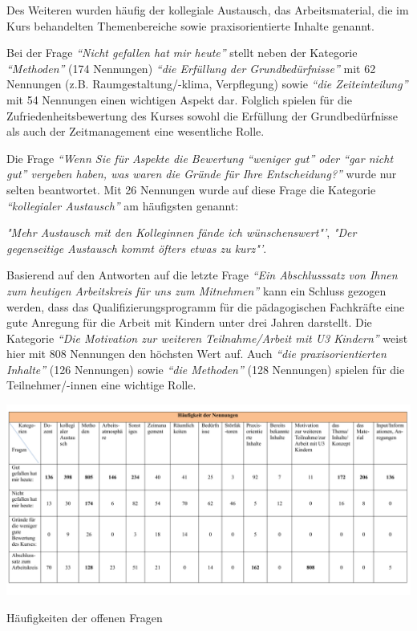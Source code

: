 \documentclass[12pt,a4paper]{article}
\begin{document}
Des Weiteren wurden häufig der kollegiale Austausch, das Arbeitsmaterial, die im Kurs behandelten Themenbereiche sowie praxisorientierte Inhalte genannt.

Bei der Frage \textit{"`Nicht gefallen hat mir heute"'} stellt neben der Kategorie \textit{"`Methoden"' }(174 Nennungen)\textit{ "`die Erfüllung der Grundbedürfnisse"'} mit 62 Nennungen (z.B. Raumgestaltung/-klima, Verpflegung) sowie \textit{"`die Zeiteinteilung"'} mit 54 Nennungen einen wichtigen Aspekt dar. Folglich spielen für die Zufriedenheitsbewertung des Kurses sowohl die Erfüllung der Grundbedürfnisse als auch der Zeitmanagement eine wesentliche Rolle. 

Die Frage \textit{"`Wenn Sie für Aspekte die Bewertung "`weniger gut"' oder "`gar nicht gut"' vergeben haben, was waren die Gründe für Ihre Entscheidung?"'} wurde nur selten beantwortet. Mit 26 Nennungen wurde auf diese Frage die Kategorie \textit{"`kollegialer Austausch"'} am häufigsten genannt:

\textit{ "Mehr Austausch mit den Kolleginnen fände ich wünschenswert"'},
\textit{ "Der gegenseitige Austausch kommt öfters etwas zu kurz"'}.

Basierend auf den Antworten auf die letzte Frage \textit{"`Ein Abschlusssatz von Ihnen zum heutigen Arbeitskreis für uns zum Mitnehmen"'} kann ein Schluss gezogen werden, dass das Qualifizierungsprogramm für die pädagogischen Fachkräfte eine gute Anregung für die Arbeit mit Kindern unter drei Jahren darstellt. Die Kategorie \textit{"`Die Motivation zur weiteren Teilnahme/Arbeit mit U3 Kindern"'} weist hier mit 808 Nennungen den höchsten Wert auf. Auch \textit{"`die praxisorientierten Inhalte"'} (126 Nennungen) sowie \textit{"`die Methoden"'} (128 Nennungen) spielen für die Teilnehmer/-innen eine wichtige Rolle. 
\begin{center}
\begin{table}[!ht]
\begin{center}
\includegraphics[scale=0.74,angle=90]{tab04.pdf}
\caption{Häufigkeiten der offenen Fragen}
\label{tab.9}
\end{center}
\end{table}
\end{center}
\end{document}
